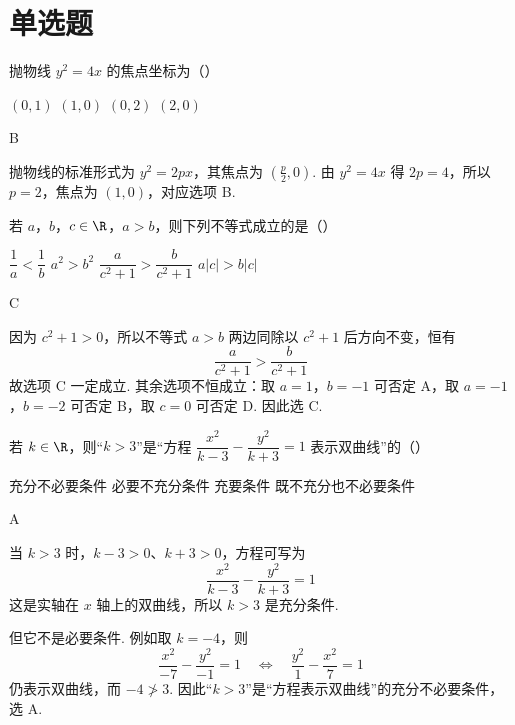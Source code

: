 \section{单选题}

\begin{problem}
抛物线 \(y^2=4x\) 的焦点坐标为（\quad）

\choices
    {\((0,1)\)}
    {\((1,0)\)}
    {\((0,2)\)}
    {\((2,0)\)}
\end{problem}

\begin{answer}
B
\end{answer}

\begin{solution}
抛物线的标准形式为 \(y^2=2px\)，其焦点为 \(\left(\frac p2,0\right)\). 由 \(y^2=4x\) 得 \(2p=4\)，所以 \(p=2\)，焦点为 \((1,0)\)，对应选项 B.
\end{solution}

\begin{problem}
若 \(a\)，\(b\)，\(c\in\R\)，\(a>b\)，则下列不等式成立的是（\quad）

\choices
    {\(\dfrac1a<\dfrac1b\)}
    {\(a^2>b^2\)}
    {\(\dfrac{a}{c^2+1}>\dfrac{b}{c^2+1}\)}
    {\(a|c|>b|c|\)}
\end{problem}

\begin{answer}
C
\end{answer}

\begin{solution}
因为 \(c^2+1>0\)，所以不等式 \(a>b\) 两边同除以 \(c^2+1\) 后方向不变，恒有
\[
\frac{a}{c^2+1}>\frac{b}{c^2+1}
\]
故选项 C 一定成立. 其余选项不恒成立：取 \(a=1\)，\(b=-1\) 可否定 A，取 \(a=-1\)，\(b=-2\) 可否定 B，取 \(c=0\) 可否定 D. 因此选 C.
\end{solution}

\begin{problem}
若 \(k\in\R\)，则“\(k>3\)”是“方程 \(\dfrac{x^2}{k-3}-\dfrac{y^2}{k+3}=1\) 表示双曲线”的（\quad）

\choices
    {充分不必要条件}
    {必要不充分条件}
    {充要条件}
    {既不充分也不必要条件}
\end{problem}

\begin{answer}
A
\end{answer}

\begin{solution}
当 \(k>3\) 时，\(k-3>0\)、\(k+3>0\)，方程可写为
\[
\frac{x^2}{k-3}-\frac{y^2}{k+3}=1
\]
这是实轴在 \(x\) 轴上的双曲线，所以 \(k>3\) 是充分条件.

但它不是必要条件. 例如取 \(k=-4\)，则
\[
\frac{x^2}{-7}-\frac{y^2}{-1}=1
\quad\Longleftrightarrow\quad
\frac{y^2}{1}-\frac{x^2}{7}=1
\]
仍表示双曲线，而 \(-4\not>3\). 因此“\(k>3\)”是“方程表示双曲线”的充分不必要条件，选 A.
\end{solution}

